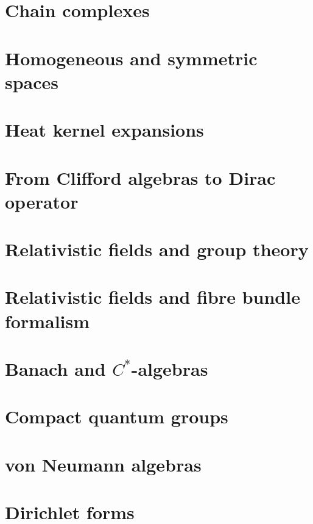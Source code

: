 \chapter{Chain complexes}


\chapter{Homogeneous and symmetric spaces}




\chapter{Heat kernel expansions}


\chapter{From Clifford algebras to Dirac operator}



\chapter{Relativistic fields and group theory}


\chapter{Relativistic fields and fibre bundle formalism}


\chapter{Banach and \texorpdfstring{$C^*$}{C*}-algebras}
   
   
   

\chapter{Compact quantum groups}


\chapter{von Neumann algebras}





\chapter{Dirichlet forms}


